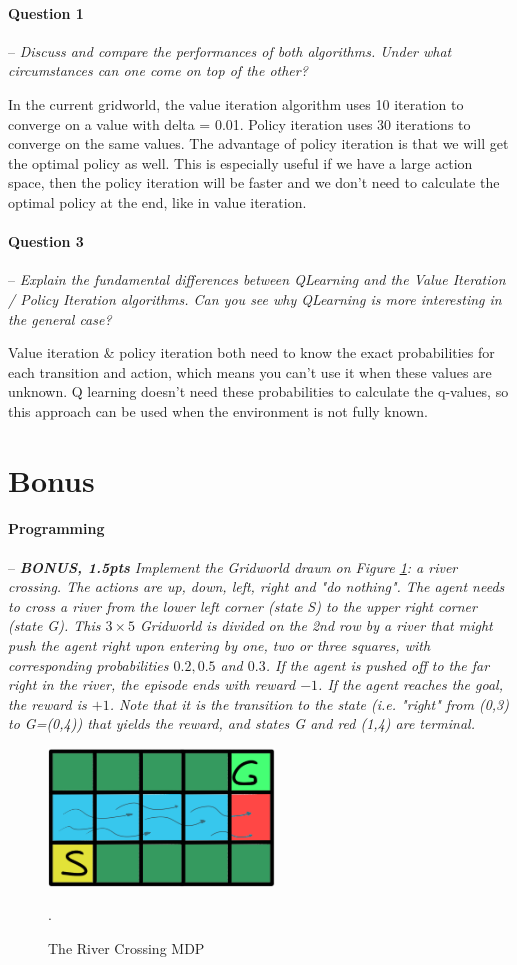 \documentclass[a4paper]{article}
\newcommand{\question}[2]{
\paragraph{Question #1} -- \textit{#2}

}
\newcommand{\programming}[1]{
\paragraph{Programming} -- \textit{#1}

}
\begin{document}
\question{1}{Discuss and compare the performances of both algorithms. Under what circumstances can one come on top of the other?}
In the current gridworld, the value iteration algorithm uses 10 iteration to converge on a value with delta = 0.01. Policy iteration uses 30 iterations to converge on the same values. The advantage of policy iteration is that we will get the optimal policy as well. This is especially useful if we have a large action space, then the policy iteration will be faster and we don't need to calculate the optimal policy at the end, like in value iteration.

\question{3}{Explain the fundamental differences between QLearning and the Value Iteration / Policy Iteration algorithms. Can you see why QLearning is more interesting in the general case?}
Value iteration \& policy iteration both need to know the exact probabilities for each transition and action, which means you can't use it when these values are unknown. Q learning doesn't need these probabilities to calculate the q-values, so this approach can be used when the environment is not fully known.

\section{Bonus}
\programming{\textbf{BONUS, 1.5pts} Implement the Gridworld drawn on Figure \ref{fig:river_crossing}: a river crossing. The actions are up, down, left, right and "do nothing". The agent needs to cross a river from the lower left corner (state S) to the upper right corner (state G). This $3\times 5$ Gridworld is divided on the 2nd row by a river that might push the agent right upon entering by one, two or three squares, with corresponding probabilities $0.2, 0.5$ and $0.3$. If the agent is pushed off to the far right in the river, the episode ends with reward $-1$. If the agent reaches the goal, the reward is $+1$. Note that it is the transition to the state (i.e. "right" from (0,3) to G=(0,4)) that yields the reward, and states G and red (1,4) are terminal. }

\begin{figure}[H]
    \centering
    \includegraphics[width=6cm]{plots/river.png}
    \caption{The River Crossing MDP}.
    \label{fig:river_crossing}
\end{figure}{}


\printbibliography
\end{document}
